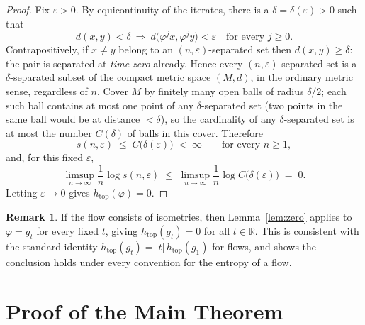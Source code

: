 \documentclass[11pt]{article}
\theoremstyle{definition}
\newtheorem{remark}[theorem]{Remark}
\newcommand{\RR}{\mathbb{R}}
\begin{document}
\begin{proof}
Fix $\varepsilon > 0$. By equicontinuity of the iterates, there is a
$\delta = \delta(\varepsilon) > 0$ such that
\[
d(x,y) < \delta \ \Longrightarrow\
d\big(\varphi^j x, \varphi^j y\big) < \varepsilon
\quad\text{for every } j \ge 0 .
\]
Contrapositively, if $x \neq y$ belong to an $(n,\varepsilon)$-separated
set then $d(x,y) \ge \delta$: the pair is separated at \emph{time zero}
already. Hence every $(n,\varepsilon)$-separated set is a
$\delta$-separated subset of the compact metric space $(M,d)$, in the
ordinary metric sense, regardless of $n$. Cover $M$ by finitely many open
balls of radius $\delta/2$; each such ball contains at most one point of
any $\delta$-separated set (two points in the same ball would be at
distance $< \delta$), so the cardinality of any $\delta$-separated set is
at most the number $C(\delta)$ of balls in this cover. Therefore
\[
s(n,\varepsilon) \;\le\; C\big(\delta(\varepsilon)\big) \;<\; \infty
\qquad\text{for every } n \ge 1 ,
\]
and, for this fixed $\varepsilon$,
\[
\limsup_{n \to \infty} \frac{1}{n} \log s(n,\varepsilon)
\;\le\;
\limsup_{n \to \infty} \frac{1}{n} \log C\big(\delta(\varepsilon)\big)
\;=\; 0 .
\]
Letting $\varepsilon \to 0$ gives $h_{\mathrm{top}}(\varphi) = 0$.
\end{proof}

\begin{remark}\label{rem:conventions}
If the flow consists of isometries, then Lemma~\ref{lem:zero} applies to
$\varphi = g_t$ for every fixed $t$, giving $h_{\mathrm{top}}(g_t) = 0$
for all $t \in \RR$. This is consistent with the standard identity
$h_{\mathrm{top}}(g_t) = |t|\, h_{\mathrm{top}}(g_1)$ for flows, and shows
the conclusion holds under every convention for the entropy of a flow.
\end{remark}

\section{Proof of the Main Theorem}
\end{document}
